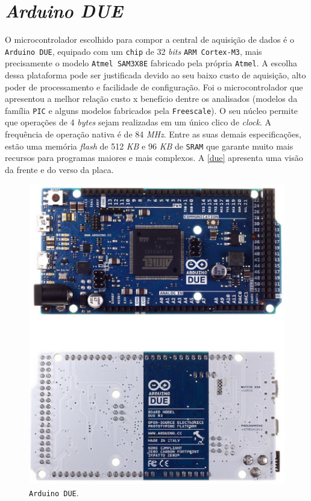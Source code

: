 \section{\textit{Arduino DUE}}



O microcontrolador escolhido para compor a central de aquisição de dados é o \texttt{Arduino DUE}, equipado com um \texttt{chip} de 32 \textit{bits} \texttt{ARM Cortex-M3}, 
mais precisamente o modelo \texttt{Atmel SAM3X8E} fabricado pela própria \texttt{Atmel}. A escolha dessa plataforma pode ser 
justificada devido ao seu baixo custo de aquisição, alto poder de processamento e facilidade de configuração. Foi o microcontrolador que 
apresentou a melhor relação custo x benefício dentre os analisados (modelos da família \texttt{PIC} e alguns modelos fabricados pela \texttt{Freescale}). 
O seu núcleo permite que operações de 4 \textit{bytes} sejam realizadas em um único clico de \textit{clock}. A frequência de operação nativa é de 84 \textit{MHz}. 
Entre as suas demais especificações, estão uma memória \textit{flash} de 512 \textit{KB} e 96 \textit{KB} de \texttt{SRAM} que garante muito mais recursos para programas 
maiores e mais complexos. A \autoref{due} apresenta uma visão da frente e do verso da placa.

\begin{figure}[h]
	\centering
	\caption{\label{due}\texttt{Arduino DUE}.}
		\includegraphics[keepaspectratio=true,scale=0.7]{figuras/due1.eps}
\end{figure}


